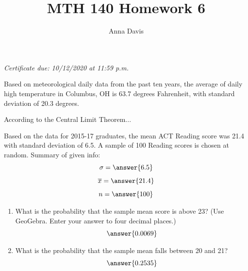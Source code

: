 \documentclass{ximera}
\author{Anna Davis} \title{MTH 140 Homework 6}
\begin{document}
\begin{abstract}

\end{abstract}
\maketitle
 \textit{Certificate due: 10/12/2020 at 11:59 p.m.}
 
 \begin{problem}\label{prob:140hom6prob1}
 Based on meteorological daily data from the past ten years, the average of daily high temperature in Columbus, OH is 63.7 degrees Fahrenheit, with standard deviation of 20.3 degrees. 
 
 According to the Central Limit Theorem...
     \begin{multipleChoice}  
\end{multipleChoice}

 \end{problem}
 
 \begin{problem}\label{prob:140hom6prob2}
 Based on the data for 2015-17 graduates, the mean ACT Reading score was 21.4 with standard deviation of 6.5.  A sample of 100 Reading scores is chosen at random.  
 Summary of given info:
$$\sigma=\answer{6.5}$$
$$\overline{x}=\answer{21.4}$$
$$n=\answer{100}$$

\begin{center}  
\end{center}
\begin{enumerate}
\item
What is the probability that the sample mean score is above 23?  (Use GeoGebra.  Enter your answer to four decimal places.)
$$\answer{0.0069}$$
\item What is the probability that the sample mean falls between 20 and 21?
$$\answer{0.2535}$$
\end{enumerate}
\end{problem}
\end{document}
